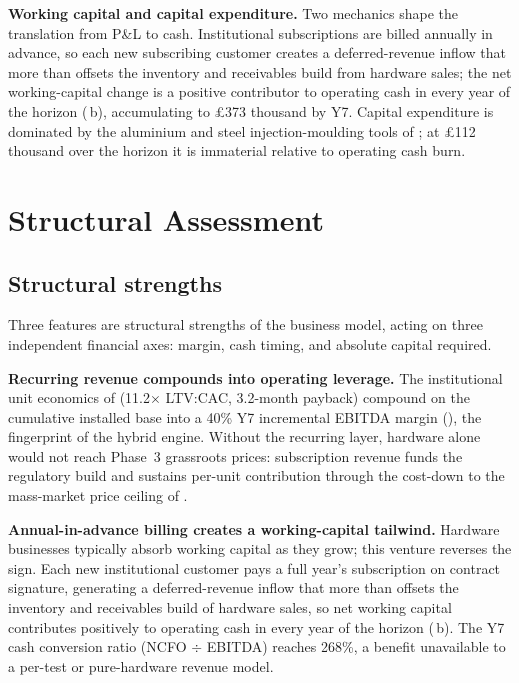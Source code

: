 \textbf{Working capital and capital expenditure.} Two mechanics shape the translation from P\&L to cash. Institutional subscriptions are billed annually in advance, so each new subscribing customer creates a deferred-revenue inflow that more than offsets the inventory and receivables build from hardware sales; the net working-capital change is a positive contributor to operating cash in every year of the horizon (\,b), accumulating to \pounds373 thousand by Y7. Capital expenditure is dominated by the aluminium and steel injection-moulding tools of ; at \pounds112 thousand over the horizon it is immaterial relative to operating cash burn.

\section{Structural Assessment}
\label{sec:ent-structural}

\subsection{Structural strengths}
\label{sec:ent-strengths}

Three features are structural strengths of the business model, acting on three independent financial axes: margin, cash timing, and absolute capital required.

\textbf{Recurring revenue compounds into operating leverage.} The institutional unit economics of  (11.2$\times$ LTV:CAC, 3.2-month payback) compound on the cumulative installed base into a 40\% Y7 incremental EBITDA margin (), the fingerprint of the hybrid engine. Without the recurring layer, hardware alone would not reach Phase~3 grassroots prices: subscription revenue funds the regulatory build and sustains per-unit contribution through the cost-down to the mass-market price ceiling of .

\textbf{Annual-in-advance billing creates a working-capital tailwind.} Hardware businesses typically absorb working capital as they grow; this venture reverses the sign. Each new institutional customer pays a full year's subscription on contract signature, generating a deferred-revenue inflow that more than offsets the inventory and receivables build of hardware sales, so net working capital contributes positively to operating cash in every year of the horizon (\,b). The Y7 cash conversion ratio (NCFO $\div$ EBITDA) reaches 268\%, a benefit unavailable to a per-test or pure-hardware revenue model.

